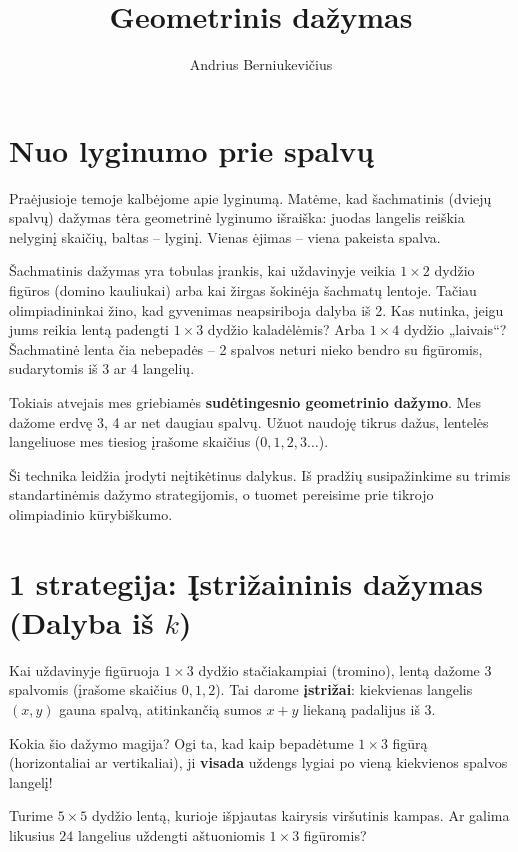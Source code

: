 \documentclass[11pt,a4paper]{scrartcl}
\title{Geometrinis dažymas}
\author{Andrius Berniukevičius}
\begin{document}
\maketitle

\section{Nuo lyginumo prie spalvų}

Praėjusioje temoje kalbėjome apie lyginumą. Matėme, kad šachmatinis (dviejų spalvų) dažymas tėra geometrinė lyginumo išraiška: juodas langelis reiškia nelyginį skaičių, baltas – lyginį. Vienas ėjimas – viena pakeista spalva.

Šachmatinis dažymas yra tobulas įrankis, kai uždavinyje veikia $1 \times 2$ dydžio figūros (domino kauliukai) arba kai žirgas šokinėja šachmatų lentoje. Tačiau olimpiadininkai žino, kad gyvenimas neapsiriboja dalyba iš 2. 
Kas nutinka, jeigu jums reikia lentą padengti $1 \times 3$ dydžio kaladėlėmis? Arba $1 \times 4$ dydžio „laivais“? Šachmatinė lenta čia nebepadės – 2 spalvos neturi nieko bendro su figūromis, sudarytomis iš 3 ar 4 langelių.

Tokiais atvejais mes griebiamės \textbf{sudėtingesnio geometrinio dažymo}. Mes dažome erdvę 3, 4 ar net daugiau spalvų. Užuot naudoję tikrus dažus, lentelės langeliuose mes tiesiog įrašome skaičius ($0, 1, 2, 3\dots$). 

Ši technika leidžia įrodyti neįtikėtinus dalykus. Iš pradžių susipažinkime su trimis standartinėmis dažymo strategijomis, o tuomet pereisime prie tikrojo olimpiadinio kūrybiškumo.

\section{1 strategija: Įstrižaininis dažymas (Dalyba iš $k$)}

Kai uždavinyje figūruoja $1 \times 3$ dydžio stačiakampiai (tromino), lentą dažome 3 spalvomis (įrašome skaičius $0, 1, 2$). Tai darome \textbf{įstrižai}: kiekvienas langelis $(x, y)$ gauna spalvą, atitinkančią sumos $x+y$ liekaną padalijus iš 3.

Kokia šio dažymo magija? Ogi ta, kad kaip bepadėtume $1 \times 3$ figūrą (horizontaliai ar vertikaliai), ji \textbf{visada} uždengs lygiai po vieną kiekvienos spalvos langelį!

\begin{example}
Turime $5 \times 5$ dydžio lentą, kurioje išpjautas kairysis viršutinis kampas. Ar galima likusius $24$ langelius uždengti aštuoniomis $1 \times 3$ figūromis?
\end{example}
\end{document}

